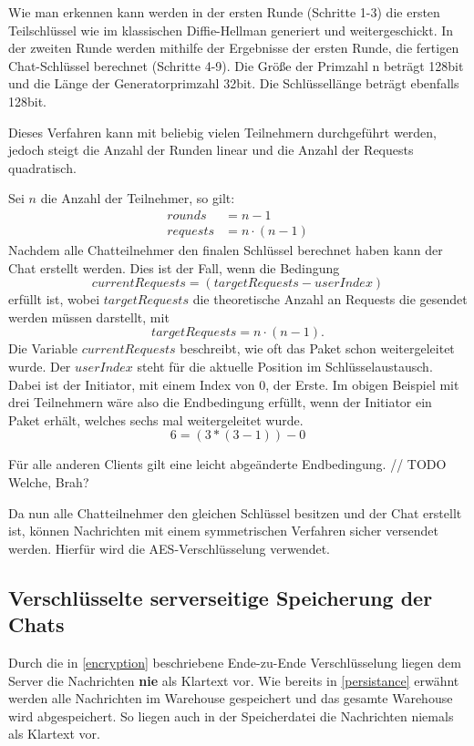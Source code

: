 Wie man erkennen kann werden in der ersten Runde (Schritte 1-3) die ersten Teilschlüssel wie im klassischen Diffie-Hellman generiert und weitergeschickt.
In der zweiten Runde werden mithilfe der Ergebnisse der ersten Runde, die fertigen Chat-Schlüssel berechnet (Schritte 4-9).
Die Größe der Primzahl n beträgt 128bit und die Länge der Generatorprimzahl 32bit. Die Schlüssellänge beträgt ebenfalls 128bit.

Dieses Verfahren kann mit beliebig vielen Teilnehmern durchgeführt werden, 
jedoch steigt die Anzahl der Runden linear und die Anzahl der Requests quadratisch.

Sei $n$ die Anzahl der Teilnehmer, so gilt:
\[
\begin{split}
  rounds &= n - 1\\
  requests &= n \cdot (n - 1)  
\end{split}
\]
Nachdem alle Chatteilnehmer den finalen Schlüssel berechnet haben kann der Chat erstellt werden. Dies ist der Fall,
wenn die Bedingung $$ currentRequests = (targetRequests - userIndex) $$ erfüllt ist, wobei $targetRequests$ die theoretische Anzahl
an Requests die gesendet werden müssen darstellt, mit $$targetRequests = n \cdot (n-1).$$
Die Variable $currentRequests$ beschreibt, wie oft das Paket schon weitergeleitet wurde.
Der $userIndex$ steht für die aktuelle Position im Schlüsselaustausch. Dabei ist der Initiator, mit einem Index von 0, der Erste.
Im obigen Beispiel mit drei Teilnehmern wäre also die Endbedingung erfüllt, wenn der Initiator ein Paket erhält, 
welches sechs mal weitergeleitet wurde.
$$ 6 = (3 * (3 - 1)) - 0 $$



Für alle anderen Clients gilt eine leicht abgeänderte Endbedingung. // TODO Welche, Brah?

Da nun alle Chatteilnehmer den gleichen Schlüssel besitzen und der Chat erstellt ist, können Nachrichten mit 
einem symmetrischen Verfahren sicher versendet werden. Hierfür wird die AES-Verschlüsselung verwendet.

\author{Troy Keßler}
\subsection{Verschlüsselte serverseitige Speicherung der Chats}
Durch die in \ref{encryption} beschriebene Ende-zu-Ende Verschlüsselung liegen dem Server die Nachrichten \textbf{nie} als Klartext vor.
Wie bereits in \ref{persistance} erwähnt werden alle Nachrichten im Warehouse gespeichert und das gesamte Warehouse wird abgespeichert.
So liegen auch in der Speicherdatei die Nachrichten niemals als Klartext vor.
